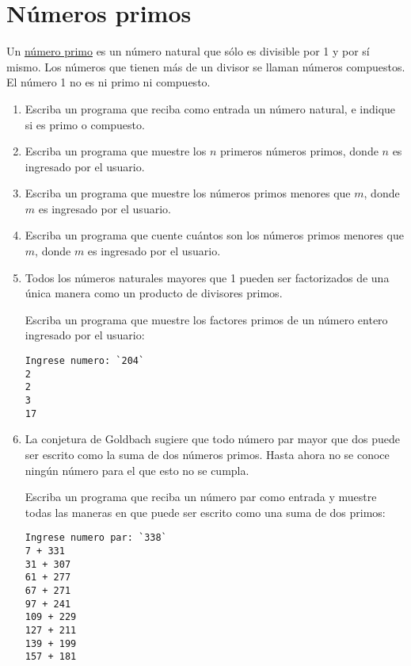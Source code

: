 \section{Números primos}
\label{sec:primos}

Un \href{http://es.wikipedia.org/wiki/N\%C3\%BAmero\_primo}{número
primo} es un número natural que sólo es divisible por 1 y por sí mismo.
Los números que tienen más de un divisor se llaman números compuestos.
El número 1 no es ni primo ni compuesto.

\begin{enumerate}

\item
  Escriba un programa que reciba como entrada un número natural, e
  indique si es primo o compuesto.

\item
  Escriba un programa que muestre los \(n\) primeros números primos, donde
  \(n\) es ingresado por el usuario.

\item
  Escriba un programa que muestre los números primos menores que \(m\),
  donde \(m\) es ingresado por el usuario.

\item
  Escriba un programa que cuente cuántos son los números primos menores
  que \(m\), donde \(m\) es ingresado por el usuario.

\item
  Todos los números naturales mayores que 1 pueden ser factorizados de
  una única manera como un producto de divisores primos.

  Escriba un programa que muestre los factores primos de un número
  entero ingresado por el usuario:

\begin{lstlisting}[language=testcase]
Ingrese numero: `204`
2
2
3
17
\end{lstlisting}

\item
  La conjetura de Goldbach sugiere que todo número par mayor que dos
  puede ser escrito como la suma de dos números primos. Hasta ahora no
  se conoce ningún número para el que esto no se cumpla.

  Escriba un programa que reciba un número par como entrada y muestre
  todas las maneras en que puede ser escrito como una suma de dos
  primos:
\begin{lstlisting}[language=testcase]
Ingrese numero par: `338`
7 + 331
31 + 307
61 + 277
67 + 271
97 + 241
109 + 229
127 + 211
139 + 199
157 + 181
\end{lstlisting}


\end{enumerate}
